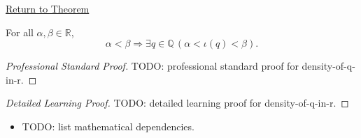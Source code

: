 \newpage
{}
\label{prf:density-of-q-in-r}

\begin{remark*}[Return]
\hyperref[thm:density-of-q-in-r]{Return to Theorem}
\end{remark*}

\begin{theorem*}[Density of $Q$ in $R$]
For all $\alpha,\beta\in\mathbb{R}$,
\[
\alpha<\beta \Longrightarrow \exists q\in\mathbb{Q}\,(\alpha<\iota(q)<\beta).
\]
\end{theorem*}

\begin{proof}[Professional Standard Proof]
\LRAProofBodyStart
TODO: professional standard proof for density-of-q-in-r.
\end{proof}

\begin{proof}[Detailed Learning Proof]
\LRAProofBodyStart
TODO: detailed learning proof for density-of-q-in-r.
\end{proof}

\begin{remark*}
\end{remark*}

\begin{dependencies}
\begin{itemize}
  \item TODO: list mathematical dependencies.
\end{itemize}
\end{dependencies}

\clearpage
